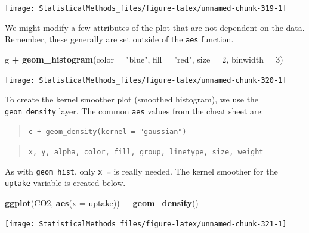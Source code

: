 \documentclass[
]{book}
\newenvironment{Shaded}{\begin{snugshade}}{\end{snugshade}}
\newcommand{\DataTypeTok}[1]{\textcolor[rgb]{0.13,0.29,0.53}{#1}}
\newcommand{\DecValTok}[1]{\textcolor[rgb]{0.00,0.00,0.81}{#1}}
\newcommand{\KeywordTok}[1]{\textcolor[rgb]{0.13,0.29,0.53}{\textbf{#1}}}
\newcommand{\NormalTok}[1]{#1}
\newcommand{\OperatorTok}[1]{\textcolor[rgb]{0.81,0.36,0.00}{\textbf{#1}}}
\newcommand{\StringTok}[1]{\textcolor[rgb]{0.31,0.60,0.02}{#1}}
\theoremstyle{definition}
\theoremstyle{definition}
\theoremstyle{definition}
\theoremstyle{remark}
\begin{document}
\begin{center}\texttt{[image: StatisticalMethods\_files/figure-latex/unnamed-chunk-319-1]} \end{center}

We might modify a few attributes of the plot that are not dependent on the data. Remember, these generally are set outside of the \texttt{aes} function.

\begin{Shaded}
\begin{Highlighting}[]
\NormalTok{g }\OperatorTok{+}\StringTok{ }\KeywordTok{geom_histogram}\NormalTok{(}\DataTypeTok{color =} \StringTok{"blue"}\NormalTok{, }\DataTypeTok{fill =} \StringTok{"red"}\NormalTok{, }\DataTypeTok{size =} \DecValTok{2}\NormalTok{, }\DataTypeTok{binwidth =} \DecValTok{3}\NormalTok{)}
\end{Highlighting}
\end{Shaded}

\begin{center}\texttt{[image: StatisticalMethods\_files/figure-latex/unnamed-chunk-320-1]} \end{center}

To create the kernel smoother plot (smoothed histogram), we use the \texttt{geom\_density} layer. The common \texttt{aes} values from the cheat sheet are:

\begin{quote}
\texttt{c\ +\ geom\_density(kernel\ =\ "gaussian")}
\end{quote}

\begin{quote}
\texttt{x,\ y,\ alpha,\ color,\ fill,\ group,\ linetype,\ size,\ weight}
\end{quote}

As with \texttt{geom\_hist}, only \texttt{x\ =} is really needed. The kernel smoother for the \texttt{uptake} variable is created below.

\begin{Shaded}
\begin{Highlighting}[]
\KeywordTok{ggplot}\NormalTok{(CO2, }\KeywordTok{aes}\NormalTok{(}\DataTypeTok{x =}\NormalTok{ uptake)) }\OperatorTok{+}\StringTok{ }\KeywordTok{geom_density}\NormalTok{()}
\end{Highlighting}
\end{Shaded}

\begin{center}\texttt{[image: StatisticalMethods\_files/figure-latex/unnamed-chunk-321-1]} \end{center}
\end{document}
